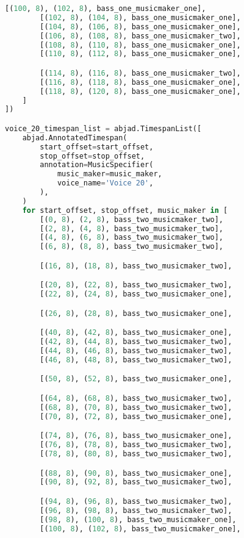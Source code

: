 \begin{lstlisting}[language=Python, caption=Invocation Source Code]
        [(100, 8), (102, 8), bass_one_musicmaker_one],
        [(102, 8), (104, 8), bass_one_musicmaker_one],
        [(104, 8), (106, 8), bass_one_musicmaker_one],
        [(106, 8), (108, 8), bass_one_musicmaker_two],
        [(108, 8), (110, 8), bass_one_musicmaker_one],
        [(110, 8), (112, 8), bass_one_musicmaker_one],

        [(114, 8), (116, 8), bass_one_musicmaker_two],
        [(116, 8), (118, 8), bass_one_musicmaker_one],
        [(118, 8), (120, 8), bass_one_musicmaker_one],
    ]
])

voice_20_timespan_list = abjad.TimespanList([
    abjad.AnnotatedTimespan(
        start_offset=start_offset,
        stop_offset=stop_offset,
        annotation=MusicSpecifier(
            music_maker=music_maker,
            voice_name='Voice 20',
        ),
    )
    for start_offset, stop_offset, music_maker in [
        [(0, 8), (2, 8), bass_two_musicmaker_two],
        [(2, 8), (4, 8), bass_two_musicmaker_two],
        [(4, 8), (6, 8), bass_two_musicmaker_two],
        [(6, 8), (8, 8), bass_two_musicmaker_two],

        [(16, 8), (18, 8), bass_two_musicmaker_two],

        [(20, 8), (22, 8), bass_two_musicmaker_two],
        [(22, 8), (24, 8), bass_two_musicmaker_one],

        [(26, 8), (28, 8), bass_two_musicmaker_one],

        [(40, 8), (42, 8), bass_two_musicmaker_one],
        [(42, 8), (44, 8), bass_two_musicmaker_two],
        [(44, 8), (46, 8), bass_two_musicmaker_two],
        [(46, 8), (48, 8), bass_two_musicmaker_two],

        [(50, 8), (52, 8), bass_two_musicmaker_one],

        [(64, 8), (68, 8), bass_two_musicmaker_two],
        [(68, 8), (70, 8), bass_two_musicmaker_two],
        [(70, 8), (72, 8), bass_two_musicmaker_one],

        [(74, 8), (76, 8), bass_two_musicmaker_one],
        [(76, 8), (78, 8), bass_two_musicmaker_two],
        [(78, 8), (80, 8), bass_two_musicmaker_two],

        [(88, 8), (90, 8), bass_two_musicmaker_one],
        [(90, 8), (92, 8), bass_two_musicmaker_two],

        [(94, 8), (96, 8), bass_two_musicmaker_two],
        [(96, 8), (98, 8), bass_two_musicmaker_two],
        [(98, 8), (100, 8), bass_two_musicmaker_one],
        [(100, 8), (102, 8), bass_two_musicmaker_one],


\end{lstlisting}
